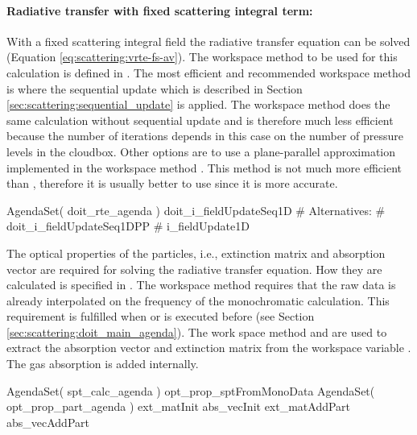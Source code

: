 \paragraph{Radiative transfer with fixed scattering integral term:}

With a fixed scattering integral field the radiative transfer equation
can be solved (Equation \ref{eq:scattering:vrte-fs-av}). The workspace
method to be used for this calculation is defined in
. The most efficient and recommended
workspace method is  where the
sequential update which is described in
Section \ref{sec:scattering:sequential_update} is applied. The workspace
method  does the same calculation
without 
sequential update and is therefore much less efficient because the
number of iterations depends in this case on the number of pressure
levels in the cloudbox.  Other options
are to use a plane-parallel approximation implemented in the workspace
method . This method is not
much more efficient than ,
therefore it is usually better to use
 since it is more accurate. 
\begin{code}
AgendaSet( doit_rte_agenda ){
     doit_i_fieldUpdateSeq1D
   # Alternatives:
   # doit_i_fieldUpdateSeq1DPP
   # i_fieldUpdate1D
   }
\end{code}
The optical properties of the particles, i.e., extinction matrix and
absorption vector are required for solving the radiative transfer
equation. How they are calculated is specified in
. The workspace method
 requires that the raw data is
already interpolated on the frequency of the monochromatic
calculation. This requirement is fulfilled when
 or 
is executed before  (see
Section \ref{sec:scattering:doit_main_agenda}). The work space method
 and  are used to
extract the absorption vector  and extinction
matrix  from the workspace variable
. The gas absorption is added internally. 
\begin{code}
AgendaSet( spt_calc_agenda ){
   opt_prop_sptFromMonoData
}
AgendaSet( opt_prop_part_agenda ){
   ext_matInit
   abs_vecInit
   ext_matAddPart
   abs_vecAddPart
}
\end{code}

